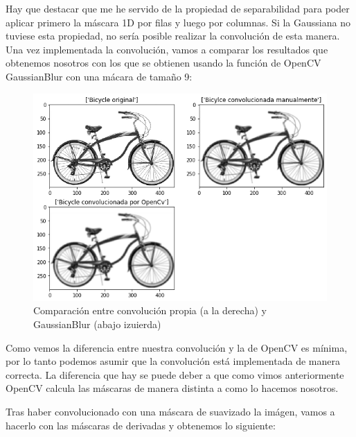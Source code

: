 \documentclass[12pt,spanish]{article}
\begin{document}
Hay que destacar que me he servido de la propiedad de separabilidad  para poder aplicar primero la máscara 1D por filas y luego por columnas. Si la Gaussiana no tuviese esta propiedad, no sería posible realizar la convolución de esta manera. \\

Una vez implementada la convolución, vamos a comparar los resultados que obtenemos nosotros con los que se obtienen usando la función de OpenCV GaussianBlur con una mácara de tamaño 9:

\begin{figure}[H]
	\centering
	\includegraphics[width=\textwidth]{./imagenes_memoria/bycicle_bifuminada.png}
	\caption{Comparación entre convolución propia (a la derecha) y GaussianBlur (abajo izuierda)}
	\label{conv_propia_vs_openCV}
\end{figure}

Como vemos la diferencia entre nuestra convolución y la de OpenCV es mínima, por lo tanto podemos asumir que la convolución está implementada de manera correcta. La diferencia que hay se puede deber a que como vimos anteriormente OpenCV calcula las máscaras de manera distinta a como lo hacemos nosotros.

\pagebreak

Tras haber convolucionado con una máscara de suavizado la imágen, vamos a hacerlo con las máscaras de derivadas y obtenemos lo siguiente:
\end{document}
